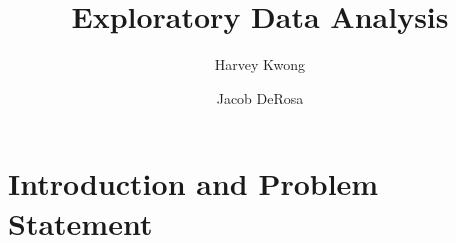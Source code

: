 \documentclass[manuscript,screen,review, nonacm]{acmart}
\begin{document}
\title{Exploratory Data Analysis}

\author{Harvey Kwong}
\author{Jacob DeRosa}


\maketitle

\section{Introduction and Problem Statement}
\end{document}
